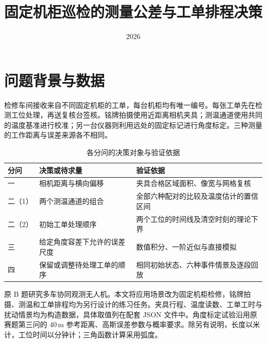 \documentclass{swmcmthesis}
\title{固定机柜巡检的测量公差与工单排程决策}
\date{2026}
\begin{document}
\makeatletter
\renewcommand{\swmcm@commit@string@problemchosen}{选题}
\renewcommand{\swmcm@commit@string@signupnum}{文稿用途}
\renewcommand{\swmcm@numberpage@string@titlea}{数维杯}
\renewcommand{\swmcm@numberpage@string@sumsheet}{数学建模练习}
\renewcommand{\swmcm@numberpage@string@summary}{摘要}
\renewcommand{\swmcm@cap@keywordsname}{关键词\quad}
\makeatother
\renewcommand{\figurename}{图}
\renewcommand{\tablename}{表}
\renewcommand{\refname}{参考文献}
\renewcommand{\contentsname}{目录}
\maketitle
{}
\tableofcontents
\clearpage

\section{问题背景与数据}
检修车间接收来自不同固定机柜的工单，每台机柜均有唯一编号。每张工单先在检测工位处理，再送复核台签核。铭牌拍摄使用近距离相机夹具；测温通道使用共同的温度基准进行校准；另一台仪器则利用远处的固定标记进行角度标定。三种测量的工作距离与误差来源各不相同。

\begin{table}[H]\centering
\caption{各分问的决策对象与验证依据}
\begin{tabular}{@{}p{.09\linewidth}p{.34\linewidth}p{.46\linewidth}@{}}
\toprule
分问 & 决策或待求量 & 验证依据\\ \midrule
一 & 相机距离与横向偏移 & 夹具合格区域面积、像宽与网格复核\\
二（1） & 两个测温通道的组合 & 全部六种配对的比较及温度估计的置信区间\\
二（2） & 初始工单处理顺序 & 两个工位的时间线及清空时刻的理论下界\\
三 & 给定角度容差下允许的误差尺度 & 数值积分、一阶近似与直接模拟\\
四 & 保留或调整待处理工单的顺序 & 相同初始状态、六种事件情景及逐段回放\\
\bottomrule
\end{tabular}
\end{table}
原 B 题研究多车协同观测无人机。本文将应用场景改为固定机柜检修，铭牌拍摄、测温和工单排程均为另行设计的练习任务。夹具行程、温度读数、工单工时与扰动情景均为构造数据，具体取值列在配套 JSON 文件中。角度标定试验沿用原赛题第三问的 40\,m 参考距离、高斯误差参数与概率要求\cite{source}。除另有说明，长度以米计，工位时间以分钟计；三角函数计算采用弧度。
\end{document}

